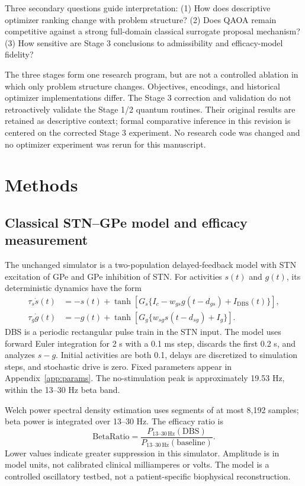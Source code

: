 \documentclass[11pt,letterpaper]{article}
\newcommand{\br}{\mathrm{BetaRatio}}
\begin{document}
Three secondary questions guide interpretation: (1) How does descriptive optimizer ranking change with problem structure? (2) Does QAOA remain competitive against a strong full-domain classical surrogate proposal mechanism? (3) How sensitive are Stage 3 conclusions to admissibility and efficacy-model fidelity?

The three stages form one research program, but are not a controlled ablation in which only problem structure changes. Objectives, encodings, and historical optimizer implementations differ. The Stage 3 correction and validation do not retroactively validate the Stage 1/2 quantum routines. Their original results are retained as descriptive context; formal comparative inference in this revision is centered on the corrected Stage 3 experiment. No research code was changed and no optimizer experiment was rerun for this manuscript.

\section{Methods}
\subsection{Classical STN--GPe model and efficacy measurement}
The unchanged simulator is a two-population delayed-feedback model with STN excitation of GPe and GPe inhibition of STN. For activities $s(t)$ and $g(t)$, its deterministic dynamics have the form
\begin{align}
\tau_s\dot{s}(t)&=-s(t)+\tanh\!\left[G_s\{I_c-w_{gs}g(t-d_{gs})+I_{\mathrm{DBS}}(t)\}\right],\\
\tau_g\dot{g}(t)&=-g(t)+\tanh\!\left[G_g\{w_{sg}s(t-d_{sg})+I_g\}\right].
\end{align}
DBS is a periodic rectangular pulse train in the STN input. The model uses forward Euler integration for 2 s with a 0.1 ms step, discards the first 0.2 s, and analyzes $s-g$. Initial activities are both 0.1, delays are discretized to simulation steps, and stochastic drive is zero. Fixed parameters appear in Appendix~\ref{app:params}. The no-stimulation peak is approximately 19.53 Hz, within the 13--30 Hz beta band.

Welch power spectral density estimation uses segments of at most 8,192 samples; beta power is integrated over 13--30 Hz. The efficacy ratio is
\begin{equation}
\br=\frac{P_{13\text{--}30\,\mathrm{Hz}}(\mathrm{DBS})}{P_{13\text{--}30\,\mathrm{Hz}}(\mathrm{baseline})}.
\end{equation}
Lower values indicate greater suppression in this simulator. Amplitude is in model units, not calibrated clinical milliamperes or volts. The model is a controlled oscillatory testbed, not a patient-specific biophysical reconstruction.
\end{document}
